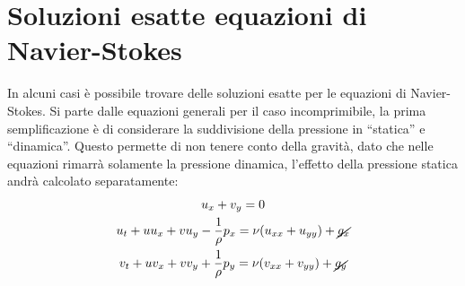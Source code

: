 %
\section{Soluzioni esatte equazioni di Navier-Stokes} 
In alcuni casi è possibile trovare delle soluzioni esatte per le equazioni di Navier-Stokes.
Si parte dalle equazioni generali per il caso incomprimibile, la prima semplificazione è di considerare la suddivisione della pressione in ``statica'' e ``dinamica''. 
Questo permette di non tenere  conto della gravità, dato che nelle equazioni rimarrà solamente la pressione dinamica, l'effetto della pressione statica andrà calcolato separatamente:
%
	\begin{equation*}
		\begin{gathered}
			u_x + v_y = 0\\
			u_t + u u_x + v u_y - \frac{1}{\rho} p_x = \nu (u_{xx} + u_{yy}) + \cancel{g_x}\\
			v_t + u v_x + v v_y + \frac{1}{\rho} p_y = \nu (v_{xx} + v_{yy}) + \cancel{g_y}
		\end{gathered}
	\end{equation*}
%

